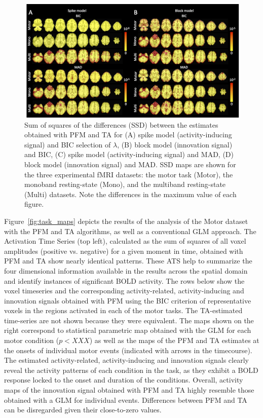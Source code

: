 \begin{figure}[t!]
    \begin{center}
        \includegraphics[width=\textwidth]{figures/comp_figure.png}
    \end{center}
    \caption{Sum of squares of the differences (SSD) between the estimates obtained with PFM and TA for (A) spike model (activity-inducing signal) and BIC selection of $\lambda$, (B) block model (innovation signal) and BIC, (C) spike model (activity-inducing signal) and MAD, (D) block model (innovation signal) and MAD. SSD maps are shown for the three experimental fMRI datasets: the motor task (Motor), the monoband resting-state (Mono), and the multiband resting-state (Multi) datasets. Note the differences in the maximum value of each figure.}
\label{fig:rss}
\end{figure}

Figure~\ref{fig:task_maps} depicts the results of the analysis of the Motor dataset with the PFM and TA algorithms, as well as a conventional GLM approach. The Activation Time Series (top left), calculated as the sum of squares of all voxel amplitudes (positive vs. negative) for a given moment in time, obtained with PFM and TA show nearly identical patterns. These ATS help to summarize the four dimensional information available in the results across the spatial domain and identify instances of significant BOLD activity. The rows below show the voxel timeseries and the corresponding activity-related, activity-inducing and innovation signals obtained with PFM using the BIC criterion of representative voxels in the regions activated in each of the motor tasks. The TA-estimated time-series are not shown because they were equivalent. The maps shown on the right correspond to statistical parametric map obtained with the GLM for each motor condition ($p < XXX$) as well as the maps of the PFM and TA estimates at the onsets of individual motor events (indicated with arrows in the timecourse). The estimated activity-related, activity-inducing and innovation signals clearly reveal the activity patterns of each condition in the task, as they exhibit a BOLD response locked to the onset and duration of the conditions. Overall, activity maps of the innovation signal obtained with PFM and TA highly resemble those obtained with a GLM for individual events. Differences between PFM and TA can be disregarded given their close-to-zero values.

